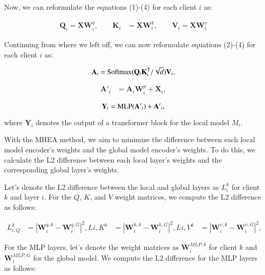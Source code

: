 Now, we can reformulate the equations (1)-(4) for each client $i$ as:

\begin{equation}
\begin{aligned}
\mathbf{Q}_i = \mathbf{X}\mathbf{W}^q_i, \qquad
\mathbf{K}_i &= \mathbf{X}\mathbf{W}^k_i, \qquad
\mathbf{V}_i = \mathbf{X}\mathbf{W}^v_i
\end{aligned}
\end{equation}

Continuing from where we left off, we can now reformulate equations (2)-(4) for each client $i$ as:

\begin{equation}
\mathbf{A}_i = {\rm Softmax}(\mathbf{Q}_i\mathbf{K}_i^{\rm T} / \sqrt{d}) \mathbf{V}_i,
\end{equation}

\begin{equation}
\begin{aligned}
\mathbf{A'}_i &= \mathbf{A}_i\mathbf{W}^p_i + \mathbf{X}_i,
\end{aligned}
\end{equation}

\begin{equation}
\mathbf{Y}_i = {\rm MLP}(\mathbf{A'}_i) + \mathbf{A'}_i,
\end{equation}

where $\mathbf{Y}_i$ denotes the output of a transformer block for the local model $M_i$.

With the MHEA method, we aim to minimize the difference between each local model encoder's weights and the global model encoder's weights. To do this, we calculate the L2 difference between each local layer's weights and the corresponding global layer's weights.

Let's denote the L2 difference between the local and global layers as $L_i^k$ for client $k$ and layer $i$. For the $Q$, $K$, and $V$ weight matrices, we compute the L2 difference as follows:

\begin{equation}
\begin{aligned}
L_{i,Q}^k &= |\mathbf{W}^{q,k}_i - \mathbf{W}^{q,G}_i|^2,
L{i,K}^k &= |\mathbf{W}^{k,k}_i - \mathbf{W}^{k,G}_i|^2,
L{i,V}^k &= |\mathbf{W}^{v,k}_i - \mathbf{W}^{v,G}_i|^2,
\end{aligned}
\end{equation}

For the MLP layers, let's denote the weight matrices as $\mathbf{W}^{MLP,k}_i$ for client $k$ and $\mathbf{W}^{MLP,G}_i$ for the global model. We compute the L2 difference for the MLP layers as follows:

